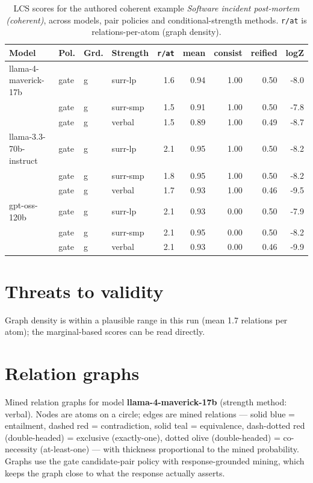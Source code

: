\documentclass[11pt]{article}
\begin{document}
\begin{table}[htbp]
\centering
\footnotesize
\setlength{\tabcolsep}{4pt}
\caption{LCS scores for the authored coherent example \emph{Software incident post-mortem (coherent)}, across models, pair policies and conditional-strength methods. \texttt{r/at} is relations-per-atom (graph density).}
\label{tab:coherent}
\begin{tabular}{llllrrrrr}
\toprule
\textbf{Model} & \textbf{Pol.} & \textbf{Grd.} & \textbf{Strength} & \texttt{r/at} & mean & consist & reified & logZ \\
\midrule
llama-4-maverick-17b & gate & g & surr-lp & 1.6 & 0.94 & 1.00 & 0.50 & -8.0 \\
 & gate & g & surr-smp & 1.5 & 0.91 & 1.00 & 0.50 & -7.8 \\
 & gate & g & verbal & 1.5 & 0.89 & 1.00 & 0.49 & -8.7 \\
\midrule
llama-3.3-70b-instruct & gate & g & surr-lp & 2.1 & 0.95 & 1.00 & 0.50 & -8.2 \\
 & gate & g & surr-smp & 1.8 & 0.95 & 1.00 & 0.50 & -8.2 \\
 & gate & g & verbal & 1.7 & 0.93 & 1.00 & 0.46 & -9.5 \\
\midrule
gpt-oss-120b & gate & g & surr-lp & 2.1 & 0.93 & 0.00 & 0.50 & -7.9 \\
 & gate & g & surr-smp & 2.1 & 0.95 & 0.00 & 0.50 & -8.2 \\
 & gate & g & verbal & 2.1 & 0.93 & 0.00 & 0.46 & -9.9 \\
\bottomrule
\end{tabular}
\end{table}


\section{Threats to validity}

Graph density is within a plausible range in this run (mean 1.7 relations per atom); the marginal-based scores can be read directly.

\section{Relation graphs}\label{sec:graphs}

Mined relation graphs for model \textbf{llama-4-maverick-17b} (strength method: verbal). Nodes are atoms on a circle; edges are mined relations --- solid blue = entailment, dashed red = contradiction, solid teal = equivalence, dash-dotted red (double-headed) = exclusive (exactly-one), dotted olive (double-headed) = co-necessity (at-least-one) --- with thickness proportional to the mined probability. Graphs use the gate candidate-pair policy with response-grounded mining, which keeps the graph close to what the response actually asserts.
\end{document}
